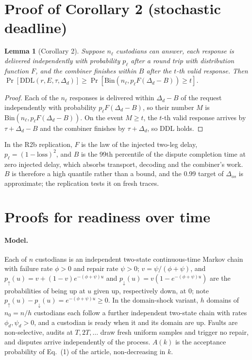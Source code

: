 \documentclass[11pt]{article}
\newtheorem*{lemmaS}{Lemma}
\begin{document}
\section{Proof of Corollary 2 (stochastic deadline)}

\begin{lemmaS}[Corollary 2]
Suppose $n_\ell$ custodians can answer, each response is delivered independently with probability $p_\ell$ after a round trip with distribution function $F$, and the combiner finishes within $B$ after the $t$-th valid response. Then $\Pr[\mathrm{DDL}(r,E,\tau,\Delta_d)]\ge\Pr[\mathrm{Bin}(n_\ell,p_\ell F(\Delta_d-B))\ge t]$.
\end{lemmaS}

\begin{proof}
Each of the $n_\ell$ responses is delivered within $\Delta_d-B$ of the request independently with probability $p_\ell F(\Delta_d-B)$, so their number $M$ is $\mathrm{Bin}(n_\ell,p_\ell F(\Delta_d-B))$. On the event $M\ge t$, the $t$-th valid response arrives by $\tau+\Delta_d-B$ and the combiner finishes by $\tau+\Delta_d$, so $\mathrm{DDL}$ holds.
\end{proof}

\noindent In the R2b replication, $F$ is the law of the injected two-leg delay, $p_\ell=(1-\mathrm{loss})^2$, and $B$ is the 99th percentile of the dispute completion time at zero injected delay, which absorbs transport, decoding and the combiner's work. $B$ is therefore a high quantile rather than a bound, and the 0.99 target of $\Delta_{os}$ is approximate; the replication tests it on fresh traces.

\section{Proofs for readiness over time}

\paragraph{Model.} Each of $n$ custodians is an independent two-state continuous-time Markov chain with failure rate $\phi>0$ and repair rate $\psi>0$; $v=\psi/(\phi+\psi)$, and $p_{\uparrow}(u)=v+(1-v)e^{-(\phi+\psi)u}$ and $p_{\downarrow}(u)=v(1-e^{-(\phi+\psi)u})$ are the probabilities of being up at $u$ given up, respectively down, at $0$; note $p_{\uparrow}(u)-p_{\downarrow}(u)=e^{-(\phi+\psi)u}\ge0$. In the domain-shock variant, $h$ domains of $n_0=n/h$ custodians each follow a further independent two-state chain with rates $\phi_d,\psi_d>0$, and a custodian is ready when it and its domain are up. Faults are non-selective, audits at $T,2T,\dots$ draw fresh uniform samples and trigger no repair, and disputes arrive independently of the process. $A(k)$ is the acceptance probability of Eq.~(1) of the article, non-decreasing in $k$.
\end{document}
